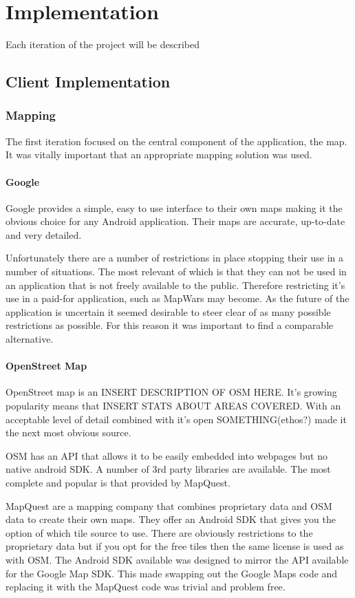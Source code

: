 \chapter{Implementation}


Each iteration of the project will be described




\section{Client Implementation}
\subsection{Mapping}
The first iteration focused on the central component of the application, the map. It was vitally important that an appropriate mapping solution was used.

\subsubsection*{Google}
Google provides a simple, easy to use interface to their own maps making it the obvious choice for any Android application. Their maps are accurate, up-to-date and very detailed.

Unfortunately there are a number of restrictions in place stopping their use in a number of situations. The most relevant of which is that they can not be used in an application that is not freely available to the public. Therefore restricting it's use in a paid-for application, such as MapWars may become. As the future of the application is uncertain it seemed desirable to steer clear of as many possible restrictions as possible. For this reason it was important to find a comparable alternative.

\subsubsection*{OpenStreet Map}
OpenStreet map is an INSERT DESCRIPTION OF OSM HERE. It's growing popularity means that INSERT STATS ABOUT AREAS COVERED. With an acceptable level of detail combined with it's open SOMETHING(ethos?) made it the next most obvious source.

OSM has an API that allows it to be easily embedded into webpages but no native android SDK. A number of 3rd party libraries are available. The most complete and popular is that provided by MapQuest.

MapQuest are a mapping company that combines proprietary data and OSM data to create their own maps. They offer an Android SDK that gives you the option of which tile source to use. There are obviously restrictions to the proprietary data but if you opt for the free tiles then the same license is used as with OSM. The Android SDK available was designed to mirror the API available for the Google Map SDK. This made swapping out the Google Maps code and replacing it with the MapQuest code was trivial and problem free.

